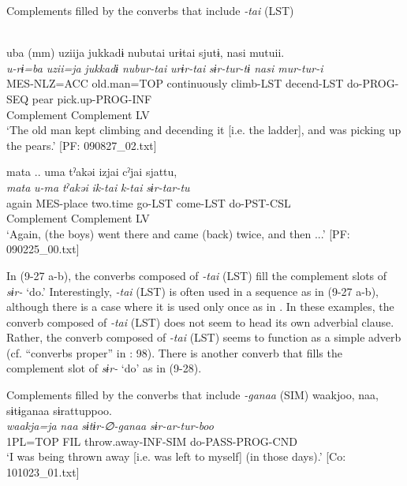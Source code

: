 \ea   Complements filled by the converbs that include \textit{{}-tai} (LST) \label{ex:9.27}

  \ea \label{ex:9.27a}\relax [= (8-93 b)]\\
    \gllll  uba  (mm)  uziija  jukkadɨ  nubutai  urɨtai  sjutɨ,  nasi  mutuii.\\
      \textit{u-rɨ=ba}    \textit{uzii=ja}  \textit{jukkadɨ}  \textit{nubur-tai} \textit{urɨr-tai}  \textit{sɨr{}-tur-tɨ  nasi  mur-tur-i}\\
      MES-NLZ=ACC    old.man=TOP  continuously  climb-LST  decend-LST  do-PROG-SEQ  pear  pick.up-PROG-INF\\
              Complement                                   Complement  LV    \\
      \glt       ‘The old man kept climbing and decending it [i.e. the ladder], and was picking up the pears.’ [PF: 090827\_02.txt]

\ex \label{ex:9.27b} %
    \gllll  mata  ..  uma  tˀakəi  izjai  cˀjai  sjattu,\\
      \textit{mata}    \textit{u-ma}  \textit{tˀakəi}  \textit{ik-tai}  \textit{k-tai}  \textit{sɨr{}-tar-tu}\\
      again    MES-place  two.time  go-LST  come-LST  do-PST-CSL\\
              Complement  Complement  LV\\
      \glt       ‘Again, (the boys) went there and came (back) twice, and then ...’ [PF: 090225\_00.txt]
    \z
\z

In (9-27 a-b), the converbs composed of \textit{{}-tai} (LST) fill the complement slots of \textit{sɨr-} ‘do.’ Interestingly, \textit{{}-tai} (LST) is often used in a sequence as in (9-27 a-b), although there is a case where it is used only once as in . In these examples, the converb composed of \textit{{}-tai} (LST) does not seem to head its own adverbial clause. Rather, the converb composed of \textit{{}-tai} (LST) seems to function as a simple adverb (cf. “converbs proper” in \citealt{Nedjalkov1995}: 98). There is another converb that fills the complement slot of \textit{sɨr-} ‘do’ as in (9-28).

\ea   Complements filled by the converbs that include \textit{{}-ganaa} (SIM) \label{ex:9.28}
 \glll  waakjoo,  naa,  sɨtɨganaa  sɨrattuppoo.\\
    \textit{waakja=ja}  \textit{naa}  \textit{sɨtɨr-∅-ganaa}  \textit{sɨr{}-ar-tur-boo}\\
    1PL=TOP  FIL  throw.away-INF-SIM  do-PASS-PROG-CND\\
    \glt     ‘I was being thrown away [i.e. was left to myself] (in those days).’ [Co: 101023\_01.txt]
\z

